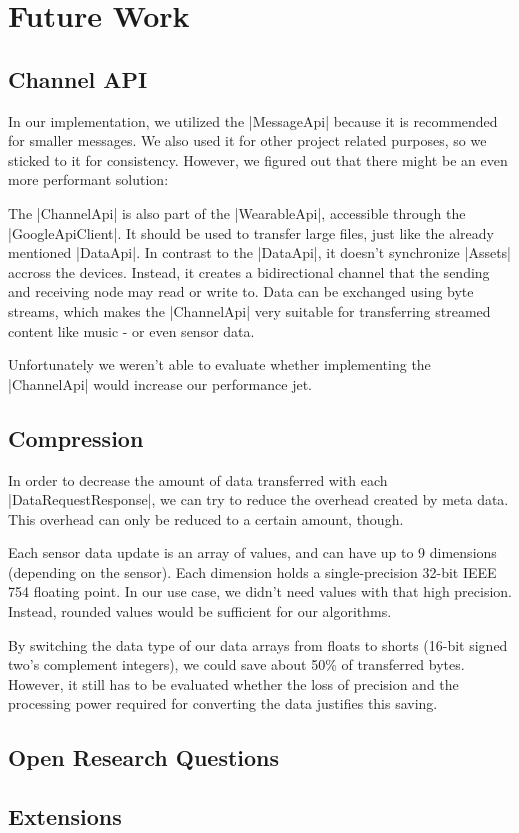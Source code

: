 \section{Future Work}
\label{sec:futurework}

\subsection{Channel API}
In our implementation, we utilized the |MessageApi|\cite{androiddocs:messageapi} because it is recommended for smaller messages.
We also used it for other project related purposes, so we sticked to it for consistency.
However, we figured out that there might be an even more performant solution:

The |ChannelApi|\cite{androiddocs:channelapi} is also part of the |WearableApi|\cite{androiddocs:wearable}, accessible through the |GoogleApiClient|\cite{androiddocs:googleapiclient}.
It should be used to transfer large files, just like the already mentioned |DataApi|\cite{androiddocs:dataapi}.
In contrast to the |DataApi|, it doesn't synchronize |Assets|\cite{androiddocs:asset} accross the devices.
Instead, it creates a bidirectional channel that the sending and receiving node may read or write to.
Data can be exchanged using byte streams, which makes the |ChannelApi| very suitable for transferring streamed content like music - or even sensor data.

Unfortunately we weren't able to evaluate whether implementing the |ChannelApi| would increase our performance jet.

\subsection{Compression}
In order to decrease the amount of data transferred with each |DataRequestResponse|\cite{sensordatalogger:datarequestresponse}, we can try to reduce the overhead created by meta data.
This overhead can only be reduced to a certain amount, though.

Each sensor data update is an array of values, and can have up to 9 dimensions (depending on the sensor).
Each dimension holds a single-precision 32-bit IEEE 754 floating point.
In our use case, we didn't need values with that high precision.
Instead, rounded values would be sufficient for our algorithms.

By switching the data type of our data arrays from floats to shorts (16-bit signed two's complement integers), we could save about 50\% of transferred bytes. However, it still has to be evaluated whether the loss of precision and the processing power required for converting the data justifies this saving.

\subsection{Open Research Questions}

\subsection{Extensions}

\clearpage